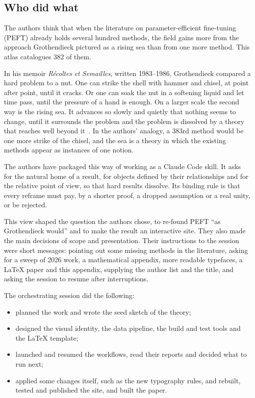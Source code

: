 \subsection{Who did what}

The authors think that when the literature on parameter-efficient fine-tuning (PEFT) already holds several hundred methods, the field gains more from the approach Grothendieck pictured as a rising sea than from one more method. This atlas catalogues 382 of them.

In his memoir \emph{Récoltes et Semailles}, written 1983--1986, Grothendieck compared a hard problem to a nut. One can strike the shell with hammer and chisel, at point after point, until it cracks. Or one can soak the nut in a softening liquid and let time pass, until the pressure of a hand is enough. On a larger scale the second way is the rising sea. It advances so slowly and quietly that nothing seems to change, until it surrounds the problem and the problem is dissolved by a theory that reaches well beyond it~\citep{xgrothendieck2022recoltes,xmclarty2007rising}. In the authors' analogy, a 383rd method would be one more strike of the chisel, and the sea is a theory in which the existing methods appear as instances of one notion.

The authors have packaged this way of working as a Claude Code skill. It asks for the natural home of a result, for objects defined by their relationships and for the relative point of view, so that hard results dissolve. Its binding rule is that every reframe must pay, by a shorter proof, a dropped assumption or a real unity, or be rejected.

This view shaped the question the authors chose, to re-found PEFT ``as Grothendieck would'' and to make the result an interactive site. They also made the main decisions of scope and presentation. Their instructions to the session were short messages: pointing out some missing methods in the literature, asking for a sweep of 2026 work, a mathematical appendix, more readable typefaces, a LaTeX paper and this appendix, supplying the author list and the title, and asking the session to resume after interruptions.

The orchestrating session did the following:

\begin{itemize}
\item planned the work and wrote the seed sketch of the theory;
\item designed the visual identity, the data pipeline, the build and test tools and the LaTeX template;
\item launched and resumed the workflows, read their reports and decided what to run next;
\item applied some changes itself, such as the new typography rules, and rebuilt, tested and published the site, and built the paper.
\end{itemize}

